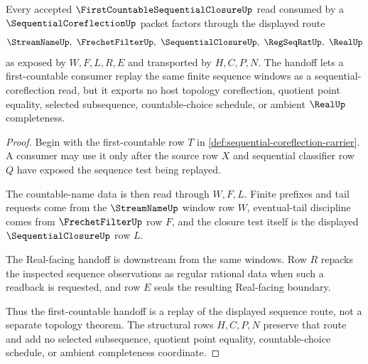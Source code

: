 \begin{theorem}
\label{thm:sequential-coreflection-first-countable-handoff}
Every accepted $\FirstCountableSequentialClosureUp$ read consumed by a $\SequentialCoreflectionUp$ packet factors through the displayed route
$$
\StreamNameUp,\ \FrechetFilterUp,\ \SequentialClosureUp,\ \RegSeqRatUp,\ \RealUp
$$
as exposed by $W,F,L,R,E$ and transported by $H,C,P,N$. The handoff lets a first-countable consumer replay the same finite sequence windows as a sequential-coreflection read, but it exports no host topology coreflection, quotient point equality, selected subsequence, countable-choice schedule, or ambient $\RealUp$ completeness.
\end{theorem}
\begin{proof}
Begin with the first-countable row $T$ in \autoref{def:sequential-coreflection-carrier}. A consumer may use it only after the source row $X$ and sequential classifier row $Q$ have exposed the sequence test being replayed.

The countable-name data is then read through $W,F,L$. Finite prefixes and tail requests come from the $\StreamNameUp$ window row $W$, eventual-tail discipline comes from $\FrechetFilterUp$ row $F$, and the closure test itself is the displayed $\SequentialClosureUp$ row $L$.

The Real-facing handoff is downstream from the same windows. Row $R$ repacks the inspected sequence observations as regular rational data when such a readback is requested, and row $E$ seals the resulting Real-facing boundary.

Thus the first-countable handoff is a replay of the displayed sequence route, not a separate topology theorem. The structural rows $H,C,P,N$ preserve that route and add no selected subsequence, quotient point equality, countable-choice schedule, or ambient completeness coordinate.
\end{proof}



